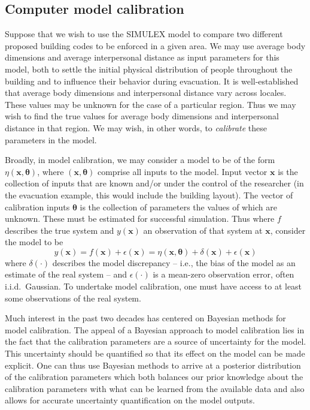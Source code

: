 \documentclass{article}
\begin{document}
\subsection{Computer model calibration} \label{computer_model_calibration}

Suppose that we wish to use the SIMULEX model to compare two different proposed building codes to be enforced in a given area. We may use average body dimensions and average interpersonal distance as input parameters for this model, both to settle the initial physical distribution of people throughout the building and to influence their behavior during evacuation. It is well-established that average body dimensions \citep{Subramanian2011,Cavelaars2000} %
and interpersonal distance \citep{Sorokowska2017} vary across locales. These values may be unknown for the case of a particular region. Thus we may wish to find the true values for average body dimensions and interpersonal distance in that region. We may wish, in other words, to \textit{calibrate} these parameters in the model.

Broadly, in model calibration, we may consider a model to be of the form $\eta(\mathbf x,\boldsymbol \theta)$, where $(\mathbf x,\boldsymbol \theta)$ comprise all inputs to the model. Input vector $\mathbf x$ is the collection of inputs that are known and/or under the control of the researcher (in the evacuation example, this would include the building layout).  The vector of calibration inputs $\boldsymbol \theta$ is the collection of parameters the values of which are unknown. These must be estimated for successful simulation. Thus where $f$ describes the true system and $y(\mathbf x)$ an observation of that system at $\mathbf x$, consider the model to be 
\begin{equation} \label{eq:model_gen}
y(\mathbf x)=f(\mathbf x)+\epsilon(\mathbf x)=\eta(\mathbf x,\boldsymbol \theta) + \delta(\mathbf x)+\epsilon(\mathbf x)
\end{equation} 
where $\delta(\cdot)$ describes the model discrepancy -- i.e., the bias of the model as an estimate of the real system -- and $\epsilon(\cdot)$ is a mean-zero observation error, often i.i.d.\ Gaussian. %
To undertake model calibration, one must have access to at least some observations of the real system.%

Much interest in the past two decades has centered on Bayesian methods for model calibration. The appeal of a Bayesian approach to model calibration lies in the fact that the calibration parameters are a source of uncertainty for the model. This uncertainty should be quantified so that its effect on the model can be made explicit. One can thus use Bayesian methods to arrive at a posterior distribution of the calibration parameters which both balances our prior knowledge about the calibration parameters with what can be learned from the available data and also allows for accurate uncertainty quantification on the model outputs. 
\end{document}

